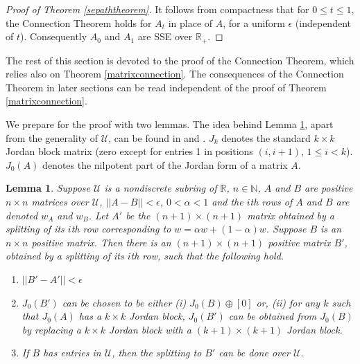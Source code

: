 \documentclass{amsart}
\newtheorem{lemma}[theorem]{Lemma}
\theoremstyle{definition}
\theoremstyle{remark}
\numberwithin{equation}{section}
\begin{document}
{{\begin{proof}[Proof of Theorem \ref{sepaththeorem}] 
It follows from compactness that for $0\leq t\leq 1$, the Connection 
Theorem 
holds for $A_t$ in place of $A$, for a uniform $\epsilon $ 
(independent of $t$). Consequently $A_0$ and $A_1$ are SSE over $\mathbb R_+$. 
\end{proof} 

 
The rest of this section is devoted to 
the proof of the Connection Theorem, which relies also on 
Theorem \ref{matrixconnection}.  The consequences of the Connection Theorem 
in later sections can be read independent of the proof of 
Theorem \ref{matrixconnection}. 
 
We  prepare for the proof with two lemmas. 
The idea behind Lemma \ref{jordanlemma}, apart from the 
generality of $\mathcal U$, 
can be found in \cite{KR5} and \cite[Lemma 1]{KR2}.
 $J_k$ denotes the standard  $k\times k$ Jordan block  matrix 
(zero except for entries 1 in positions $(i,i+1)$, $1\leq i < k$). 
$J_0(A)$ denotes the nilpotent part of the Jordan form of a matrix $A$.


\begin{lemma} \label{jordanlemma} 
Suppose $\mathcal U$ is a nondiscrete subring of $\mathbb R$, 
$n\in \mathbb N$, $A$ and $B$ are positive $n\times n$ 
matrices over $\mathcal U$, $||A-B||<\epsilon$, 
$0<\alpha < 1$ and the $i$th rows of $A$ and $B$ are denoted 
$w_A$ and $w_B$. 
Let $A'$ be the 
 $(n+1)\times (n+1)$ matrix obtained by a splitting 
of its $i$th row corresponding 
to $w = \alpha w + (1-\alpha )w$. Suppose $B$ is an $n\times n$ 
positive matrix. 
Then there is an $(n+1)\times (n+1)$ positive matrix $B'$, 
obtained by a splitting of its $i$th row,
 such that 
the following hold. 
\begin{enumerate} 
\item 
$||B'-A'|| <  \epsilon $ 
\item 
 $J_0(B')$ can be chosen to be either 
(i) $J_0(B) \oplus [0]$ or, (ii) for 
any $k$ such that $J_0(A) $ has a $k\times k$ Jordan block, 
$J_0(B')$ can be obtained  
from $J_0(B) $ by replacing a 
$k\times k$ Jordan block 
with a $(k+1)\times (k+1)$ Jordan block. 
\item 
If $B$ has entries in $\mathcal U$, then 
the splitting to $B'$ can be done over $\mathcal U$. 
\end{enumerate} 
\end{lemma} 

}}
\end{document}
